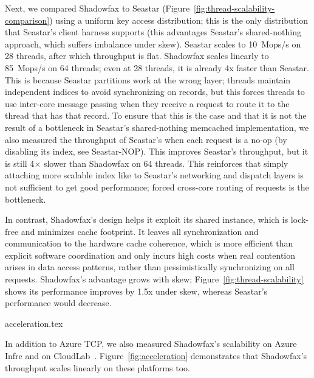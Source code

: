 Next, we compared Shadowfax to Seastar
(Figure~\ref{fig:thread-scalability-comparison}) using a uniform key access
distribution; this is the only distribution that Seastar's client harness
supports (this advantages Seastar's shared-nothing approach, which suffers
imbalance under skew).
%
Seastar scales to 10~Mops/s on 28 threads, after which throughput is flat.
%
Shadowfax scales linearly to 85~Mops/s on 64 threads; even at 28 threads, it is
already 4x faster than Seastar.
%
This is because Seastar partitions work at the wrong layer; threads maintain
independent indices to avoid synchronizing on records, but this forces threads
to use inter-core message passing when they receive a request to route it to
the thread that has that record.
%
To ensure that this is the case and that it is not the result of a bottleneck in
Seastar's shared-nothing memcached implementation, we also measured the
throughput of Seastar's when each request is a no-op (by disabling its index,
see Seastar-NOP).
%
This improves Seastar's throughput, but it is still 4$\times{}$ slower
than Shadowfax on 64 threads.
%
This reinforces that simply attaching more scalable index like
\faster to Seastar's networking and dispatch layers is not sufficient to get
good performance; forced cross-core routing of requests is the bottleneck.

In contrast, Shadowfax's design helps it exploit its shared \faster instance,
which is lock-free and minimizes cache footprint.
%
It leaves all synchronization and communication to the hardware
cache coherence, which is more efficient than explicit software
coordination and only incurs high costs when real contention arises in data
access patterns, rather than pessimistically synchronizing on all requests.
%
Shadowfax's advantage grows with skew;
Figure~\ref{fig:thread-scalability} shows its performance improves by 1.5x
under skew, whereas Seastar's performance would decrease.
%
%

 {acceleration.tex}

In addition to Azure TCP, we also measured Shadowfax's scalability on
Azure Infrc and on CloudLab~\cite{cloudlab}.
%
Figure~\ref{fig:acceleration} demonstrates that Shadowfax's throughput
scales linearly on these platforms too.

